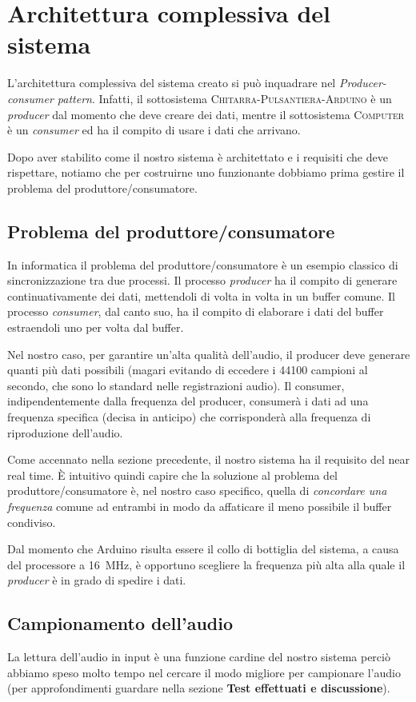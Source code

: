 \documentclass[a4paper,11pt]{article}
\begin{document}
\section{Architettura complessiva del sistema}

L'architettura complessiva del sistema creato si può inquadrare nel \textit{Producer-consumer pattern}. Infatti, il sottosistema \textsc{Chitarra-Pulsantiera-Arduino} è un \textit{producer} dal momento che deve creare dei dati, mentre il sottosistema \textsc{Computer} è un \textit{consumer} ed ha il compito di usare i dati che arrivano.

Dopo aver stabilito come il nostro sistema è architettato e i requisiti che deve rispettare, notiamo che per costruirne uno funzionante dobbiamo prima gestire il problema del produttore/consumatore.

\subsection{Problema del produttore/consumatore}
In informatica il problema del produttore/consumatore è un esempio classico di sincronizzazione tra due processi. Il processo \textit{producer} ha il compito di generare continuativamente dei dati, mettendoli di volta in volta in un buffer comune. Il processo \textit{consumer}, dal canto suo, ha il compito di elaborare i dati del buffer estraendoli uno per volta dal buffer.

Nel nostro caso, per garantire un'alta qualità dell'audio, il producer deve generare quanti più dati possibili (magari evitando di eccedere i \num{44100} campioni al secondo, che sono lo standard nelle registrazioni audio). Il consumer, indipendentemente dalla frequenza del producer, consumerà i dati ad una frequenza specifica (decisa in anticipo) che corrisponderà alla frequenza di riproduzione dell'audio.

Come accennato nella sezione precedente, il nostro sistema ha il requisito del near real time. È intuitivo quindi capire che la soluzione al problema del produttore/consumatore è, nel nostro caso specifico, quella di \textit{concordare una frequenza} comune ad entrambi in modo da affaticare il meno possibile il buffer condiviso.

Dal momento che Arduino risulta essere il collo di bottiglia del sistema, a causa del processore a \SI{16}{\mega\hertz}, è opportuno scegliere la frequenza più alta alla quale il \textit{producer} è in grado di spedire i dati.

\subsection{Campionamento dell'audio}
La lettura dell'audio in input è una funzione cardine del nostro sistema perciò abbiamo speso molto tempo nel cercare il modo migliore per campionare l'audio (per approfondimenti guardare nella sezione \textbf{Test effettuati e discussione}).
\end{document}

